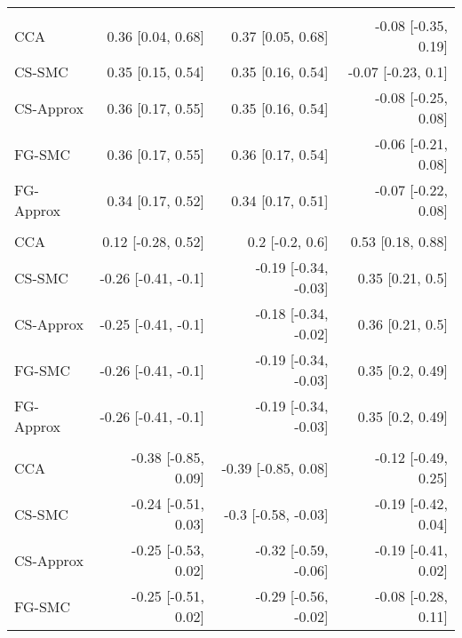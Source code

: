 \documentclass[
  12pt,
  a4paper,
]{article}
\begin{document}
\begin{longtable}[t]{lrrr}
\addlinespace[0.3em]
\multicolumn{4}{l}{\textbf{Cytogenetics: abnormal}}\\
\hspace{1em}CCA & 0.36 [0.04, 0.68] & 0.37 [0.05, 0.68] & -0.08 [-0.35, 0.19]\\
\hspace{1em}CS-SMC & 0.35 [0.15, 0.54] & 0.35 [0.16, 0.54] & -0.07 [-0.23, 0.1]\\
\hspace{1em}CS-Approx & 0.36 [0.17, 0.55] & 0.35 [0.16, 0.54] & -0.08 [-0.25, 0.08]\\
\hspace{1em}FG-SMC & 0.36 [0.17, 0.55] & 0.36 [0.17, 0.54] & -0.06 [-0.21, 0.08]\\
\hspace{1em}FG-Approx & 0.34 [0.17, 0.52] & 0.34 [0.17, 0.51] & -0.07 [-0.22, 0.08]\\
\addlinespace[0.3em]
\multicolumn{4}{l}{\textbf{Donor relation: other}}\\
\hspace{1em}CCA & 0.12 [-0.28, 0.52] & 0.2 [-0.2, 0.6] & 0.53 [0.18, 0.88]\\
\hspace{1em}CS-SMC & -0.26 [-0.41, -0.1] & -0.19 [-0.34, -0.03] & 0.35 [0.21, 0.5]\\
\hspace{1em}CS-Approx & -0.25 [-0.41, -0.1] & -0.18 [-0.34, -0.02] & 0.36 [0.21, 0.5]\\
\hspace{1em}FG-SMC & -0.26 [-0.41, -0.1] & -0.19 [-0.34, -0.03] & 0.35 [0.2, 0.49]\\
\hspace{1em}FG-Approx & -0.26 [-0.41, -0.1] & -0.19 [-0.34, -0.03] & 0.35 [0.2, 0.49]\\
\addlinespace[0.3em]
\multicolumn{4}{l}{\textbf{Hemoglobin (per $5$ g/dL)}}\\
\hspace{1em}CCA & -0.38 [-0.85, 0.09] & -0.39 [-0.85, 0.08] & -0.12 [-0.49, 0.25]\\
\hspace{1em}CS-SMC & -0.24 [-0.51, 0.03] & -0.3 [-0.58, -0.03] & -0.19 [-0.42, 0.04]\\
\hspace{1em}CS-Approx & -0.25 [-0.53, 0.02] & -0.32 [-0.59, -0.06] & -0.19 [-0.41, 0.02]\\
\hspace{1em}FG-SMC & -0.25 [-0.51, 0.02] & -0.29 [-0.56, -0.02] & -0.08 [-0.28, 0.11]\\

\end{longtable}
\end{document}
